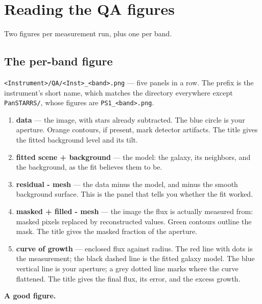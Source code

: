 \documentclass[11pt]{article}
\begin{document}
\section{Reading the QA figures}
\label{sec:qa}

Two figures per measurement run, plus one per band.

\subsection{The per-band figure}

\texttt{<Instrument>/QA/<Inst>\_<band>.png} --- five panels in a row.
The prefix is the instrument's short name, which matches the directory
everywhere except \texttt{PanSTARRS/}, whose figures are
\texttt{PS1\_<band>.png}.

\begin{enumerate}
  \item \textbf{data} --- the image, with stars already subtracted. The
        blue circle is your aperture. Orange contours, if present, mark
        detector artifacts. The title gives the fitted background level
        and its tilt.
  \item \textbf{fitted scene + background} --- the model: the galaxy, its
        neighbors, and the background, as the fit believes them to be.
  \item \textbf{residual - mesh} --- the data minus the model, and minus
        the smooth background surface. This is the panel that tells you
        whether the fit worked.
  \item \textbf{masked + filled - mesh} --- the image the flux is actually
        measured from: masked pixels replaced by reconstructed values.
        Green contours outline the mask. The title gives the masked
        fraction of the aperture.
  \item \textbf{curve of growth} --- enclosed flux against radius. The red
        line with dots is the measurement; the black dashed line is the
        fitted galaxy model. The blue vertical line is your aperture; a
        grey dotted line marks where the curve flattened. The title gives
        the final flux, its error, and the excess growth.
\end{enumerate}

\textbf{A good figure.}
\end{document}
